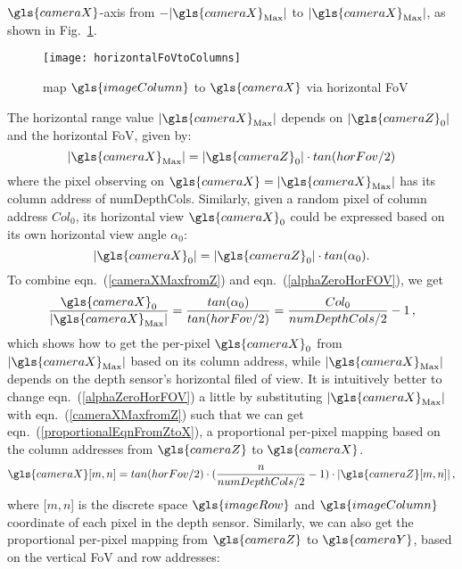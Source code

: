 \(\gls{cameraX}\)-axis from \(-|\gls{cameraX}_{\text{Max}}|\) to \(|\gls{cameraX}_{\text{Max}}|\), as shown in Fig.~\ref{horizontalFoVtoColumns}. %
\begin{figure}[!t]
\centering
\texttt{[image: horizontalFoVtoColumns]}
\caption{map \(\gls{imageColumn}\) to \(\gls{cameraX}\) via horizontal \gls{FoV}}
\label{horizontalFoVtoColumns}
\end{figure}%
%
The horizontal range value \(|\gls{cameraX}_{\text{Max}}|\) depends on \(|\gls{cameraZ}_0|\) and the horizontal \gls{FoV}, given by:
%
\begin{equation}
|\gls{cameraX}_{\text{Max}}| = |\gls{cameraZ}_0| \cdot tan(horFov / 2) 
\label{cameraXMaxfromZ}
\end{equation}%
\noindent
where the pixel observing on \(\gls{cameraX} = |\gls{cameraX}_{\text{Max}}|\) has its column address of numDepthCols. Similarly, given a random pixel of column address \(Col_0\), its horizontal view \(\gls{cameraX}_0\) could be expressed based on its own horizontal view angle \(\alpha_0\):
%
\begin{equation}
|\gls{cameraX}_{0}| = |\gls{cameraZ}_0| \cdot tan(\alpha_0)  .
\label{alphaZeroHorFOV}
\end{equation}%
\noindent
To combine eqn.~(\ref{cameraXMaxfromZ}) and eqn.~(\ref{alphaZeroHorFOV}), we get
%
\begin{equation}
\frac{\gls{cameraX}_0}{|\gls{cameraX}_{\text{Max}}|} = \frac{tan(\alpha_0)}{tan(horFov / 2)} = \frac{Col_0}{numDepthCols/2} - 1\, ,
\label{alphaZeroHorFOV}
\end{equation}%
\noindent
which shows how to get the per-pixel \(\gls{cameraX}_0\) from \(|\gls{cameraX}_{\text{Max}}|\) based on its column address, while \(|\gls{cameraX}_{\text{Max}}|\) depends on the depth sensor's horizontal filed of view. It is intuitively better to change eqn.~(\ref{alphaZeroHorFOV}) a little by substituting \(|\gls{cameraX}_{\text{Max}}|\) with eqn.~(\ref{cameraXMaxfromZ}) such that we can get eqn.~(\ref{proportionalEqnFromZtoX}), a proportional per-pixel mapping based on the column addresses from \(\gls{cameraZ}\) to \(\gls{cameraX}\).
%
\begin{equation}
\gls{cameraX}[m, n] = tan(horFov / 2) \cdot (\frac{n}{numDepthCols/2} - 1) \cdot |\gls{cameraZ}[m, n]|\, ,
\label{proportionalEqnFromZtoX}
\end{equation}%
\noindent
where [\(m,n\)] is the discrete space \(\gls{imageRow}\) and \(\gls{imageColumn}\) coordinate of each pixel in the depth sensor. Similarly, we can also get the proportional per-pixel mapping from \(\gls{cameraZ}\) to \(\gls{cameraY}\), based on the vertical \gls{FoV} and row addresses:

